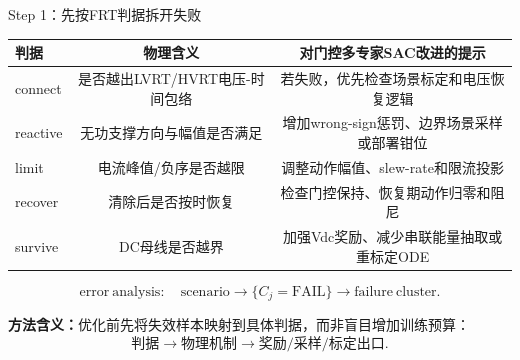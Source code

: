 \documentclass[10pt,aspectratio=169,mathserif]{beamer}
\newcommand{\fail}{\ensuremath{\mathrm{FAIL}}}
\begin{document}
\begin{frame}{Step 1：先按FRT判据拆开失败}
\begin{table}
\centering\small
\begin{tabular}{lcc}
\toprule
判据 & 物理含义 & 对门控多专家SAC改进的提示 \\
\midrule
connect & 是否越出LVRT/HVRT电压-时间包络 & 若失败，优先检查场景标定和电压恢复逻辑 \\
reactive & 无功支撑方向与幅值是否满足 & 增加wrong-sign惩罚、边界场景采样或部署钳位 \\
limit & 电流峰值/负序是否越限 & 调整动作幅值、slew-rate和限流投影 \\
recover & 清除后是否按时恢复 & 检查门控保持、恢复期动作归零和阻尼 \\
survive & DC母线是否越界 & 加强Vdc奖励、减少串联能量抽取或重标定ODE \\
\bottomrule
\end{tabular}
\end{table}

\[
\mathrm{error\ analysis}:\quad
\mathrm{scenario}\rightarrow\{C_j=\fail\}\rightarrow\mathrm{failure\ cluster}.
\]

\medskip
\textbf{方法含义：}优化前先将失效样本映射到具体判据，而非盲目增加训练预算：
\[
\text{判据}\rightarrow\text{物理机制}\rightarrow\text{奖励/采样/标定出口}.
\]
\end{frame}
\end{document}
